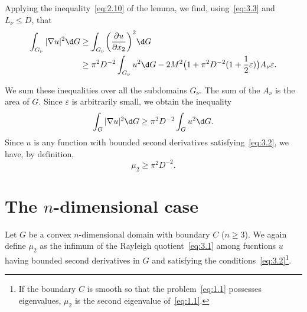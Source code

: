 \documentclass{article}
\theoremstyle{remarks}
\begin{document}
Applying the inequality~\eqref{eq:2.10} of the lemma, we find, using~\eqref{eq:3.3}
and $L_\nu\leq D$, that
\begin{equation}\label{eq:3.9}
  \begin{aligned}
    \int_{G_\nu} |\nabla u|^2 \d G
    & \geq \int_{G_\nu} \biggl(\frac{\partial u}{\partial x_2}\biggr)^2 \d G \\
    & \geq \pi^2 D^{-2} \int_{G_\nu} u^2 \d G
        - 2M^2 \bigl(1+\pi^2 D^{-2} (1+\frac12 \varepsilon)\bigr) A_\nu \varepsilon.
  \end{aligned}
\end{equation}

We sum these inequalities over all the subdomains $G_\nu$.
The sum of the $A_\nu$ is the area of $G$. Since $\varepsilon$
is arbitrarily small, we obtain the inequality
\begin{equation}\label{eq:3.10}
  \int_G |\nabla u|^2 \d G \geq \pi^2 D^{-2} \int_G u^2 \d G.
\end{equation}
Since $u$ is any function with bounded second derivatives satisfying~\eqref{eq:3.2},
we have, by definition,
\begin{equation}\label{eq:3.11}
  \mu_2 \geq \pi^2 D^{-2}.
\end{equation}


\section{The $n$-dimensional case}

Let $G$ be a convex $n$-dimensional domain with boundary $C$ ($n\geq 3$).
We again define $\mu_2$ as the infimum of the Rayleigh quotient~\eqref{eq:3.1}
among fucntions $u$ having bounded second derivatives in $G$ and satisfying
the conditions~\eqref{eq:3.2}\footnote{If the boundary $C$ is smooth so that
the problem~\eqref{eq:1.1} possesses eigenvalues, $\mu_2$ is the second
eigenvalue of~\eqref{eq:1.1}.}.
\end{document}
